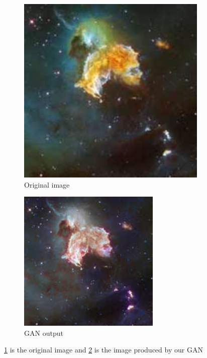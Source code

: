\documentclass[10pt,twocolumn,letterpaper]{article}
\begin{document}
\begin{figure}[!htb]
    	\centering
    	\begin{subfigure}[b]{0.2\textwidth}
    		\centering
    		\includegraphics[width=\textwidth]{figures/original_sample}
    		\caption{Original image}
    		\label{fig: original_sample}
    	\end{subfigure}
    	\begin{subfigure}[b]{0.2\textwidth}
    		\centering
    		\includegraphics[width=\textwidth]{figures/GAN_output_sample}
    		\caption{GAN output}
    		\label{fig: gan_output_sample}
    	\end{subfigure}
    	\caption{\cref{fig: original_sample} is the original image and \cref{fig: gan_output_sample} is the image produced by our GAN}
    	\label{fig: sample_comp}
\end{figure}
\end{document}
